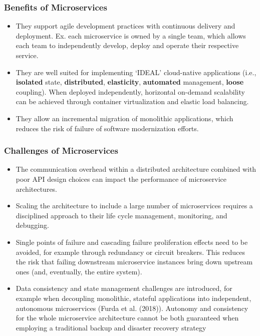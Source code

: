 \subsubsection{Benefits of Microservices}
\begin{itemize}
  \item They support agile development practices with continuous delivery and deployment. Ex. each microservice is owned by a single team, which allows each team to independently develop, deploy and operate their respective service.
  \item They are well suited for implementing ‘IDEAL’ cloud-native applications (i.e., \textbf{isolated} state, \textbf{distributed}, \textbf{elasticity}, \textbf{automated} management, \textbf{loose} coupling). When deployed independently, horizontal on-demand scalability can be achieved through container virtualization and elastic load balancing.
  \item They allow an incremental migration of monolithic applications, which reduces the risk of failure of software modernization efforts.
\end{itemize}

\subsubsection{Challenges of Microservices}
\begin{itemize}
  \item The communication overhead within a distributed architecture combined with poor API design choices can impact the performance of microservice architectures.
  \item Scaling the architecture to include a large number of microservices requires a disciplined approach to their life cycle management, monitoring, and debugging.
  \item Single points of failure and cascading failure proliferation effects need to be avoided, for example through redundancy or circuit breakers. This reduces the risk that failing downstream microservice instances bring down upstream ones (and, eventually, the entire system).
  \item Data consistency and state management challenges are introduced, for example when decoupling monolithic, stateful applications into independent, autonomous microservices (Furda et al. (2018)).
Autonomy and consistency for the whole microservice architecture cannot be both guaranteed when employing a traditional backup and disaster recovery strategy
\end{itemize}

